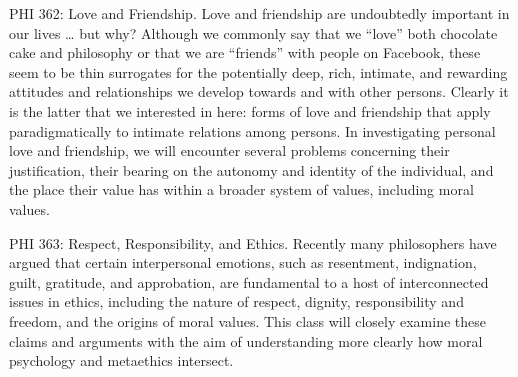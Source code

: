 \documentclass[%
  11pt,%
]{article}
\begin{document}
\begin{htmlcourse}{PHI 362: Love and Friendship.}
  Love and friendship are undoubtedly important in our lives \dots{} but why? Although we commonly say that we \enquote{love} both chocolate cake and philosophy or that we are \enquote{friends} with people on Facebook, these seem to be thin surrogates for the potentially deep, rich, intimate, and rewarding attitudes and relationships we develop towards and with other persons. Clearly it is the latter that we interested in here: forms of love and friendship that apply paradigmatically to intimate relations among persons. In investigating personal love and friendship, we will encounter several problems concerning their justification, their bearing on the autonomy and identity of the individual, and the place their value has within a broader system of values, including moral values.
\end{htmlcourse}

\begin{htmlcourse}{PHI 363: Respect, Responsibility, and Ethics.}
  Recently many philosophers have argued that certain interpersonal emotions, such as resentment, indignation, guilt, gratitude, and approbation, are fundamental to a host of interconnected issues in ethics, including the nature of respect, dignity, responsibility and freedom, and the origins of moral values. This class will closely examine these claims and arguments with the aim of understanding more clearly how moral psychology and metaethics intersect.
\end{htmlcourse}

\ifdefined\HCode
\fi
\end{document}
